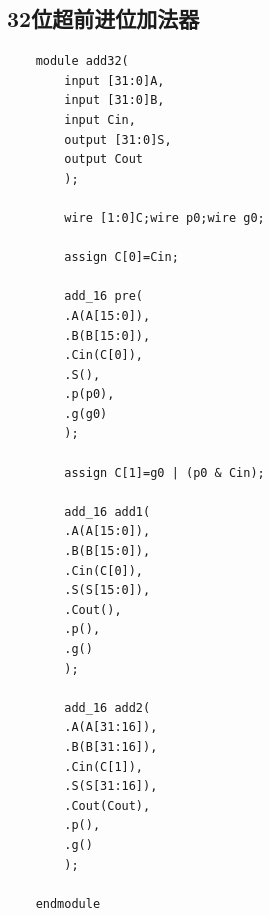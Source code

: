 \documentclass[fontset=windows,12pt]{article}
\begin{document}
    \subsection{32位超前进位加法器}
    {\setmainfont{Courier New Bold} 
    \begin{lstlisting}
    module add32(
        input [31:0]A,
        input [31:0]B,
        input Cin,
        output [31:0]S,
        output Cout
        );
        
        wire [1:0]C;wire p0;wire g0;
        
        assign C[0]=Cin;
        
        add_16 pre(
        .A(A[15:0]),
        .B(B[15:0]),
        .Cin(C[0]),
        .S(),
        .p(p0),
        .g(g0)
        );
        
        assign C[1]=g0 | (p0 & Cin);
        
        add_16 add1(
        .A(A[15:0]),
        .B(B[15:0]),
        .Cin(C[0]),
        .S(S[15:0]),
        .Cout(),
        .p(),
        .g()
        );
        
        add_16 add2(
        .A(A[31:16]),
        .B(B[31:16]),
        .Cin(C[1]),
        .S(S[31:16]),
        .Cout(Cout),
        .p(),
        .g()
        );
        
    endmodule
    \end{lstlisting}}
\end{document}
